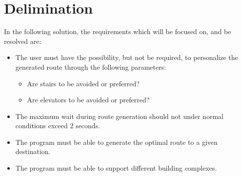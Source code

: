 
\section{Delimination}\label{sec:delimination}


In the following solution, the requirements which will be focused on, and be resolved are:

\begin{itemize}
  \item The user must have the possibility, but not be required, to personalize the generated route through the following parameters:
      \begin{itemize}
        \item Are stairs to be avoided or preferred?
        \item Are elevators to be avoided or preferred?
      \end{itemize}
  \item The maximum wait during route generation should not under normal conditions exceed 2 seconds.

  \item The program must be able to generate the optimal route to a given destination.

  \item The program must be able to support different building complexes.

\end{itemize}


